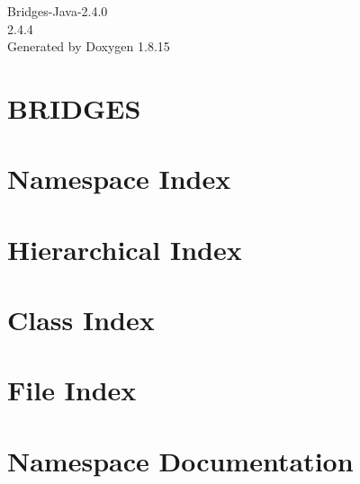 \let\mypdfximage\pdfximage\def\pdfximage{\immediate\mypdfximage}\documentclass[twoside]{book}
\newcommand{\+}{\discretionary{\mbox{\scriptsize$\hookleftarrow$}}{}{}}
\newcommand{\clearemptydoublepage}{%
  \newpage{\pagestyle{empty}\cleardoublepage}%
}
\begin{document}
\hypersetup{pageanchor=false,
             bookmarksnumbered=true,
             pdfencoding=unicode
            }
\begin{titlepage}
\vspace*{7cm}
\begin{center}%
{\Large Bridges-\/\+Java-\/2.4.0 \\[1ex]\large 2.\+4.\+4 }\\
\vspace*{1cm}
{\large Generated by Doxygen 1.8.15}\\
\end{center}
\end{titlepage}
\clearemptydoublepage
{}
\tableofcontents
\clearemptydoublepage
{}
\hypersetup{pageanchor=true}

\chapter{B\+R\+I\+D\+G\+ES}
\label{index}\hypertarget{index}{}
\chapter{Namespace Index}

\chapter{Hierarchical Index}

\chapter{Class Index}

\chapter{File Index}

\chapter{Namespace Documentation}





\end{document}
